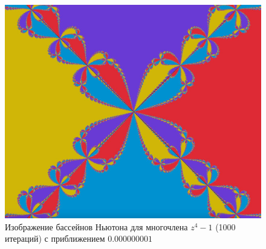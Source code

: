 \documentclass{article}
\begin{document}
\begin{figure}
   \centering
   \includegraphics[width=0.5\linewidth]{n4.jpg}
   \caption{Изображение бассейнов Ньютона для многочлена $z^4 - 1$ (1000 итераций) с приближением $0.000000001$}
   \label{fig:enter-label}
\end{figure}
\end{document}
